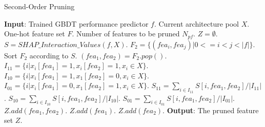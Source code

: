 \documentclass{article}
\begin{document}
\begin{algorithm}[ht]
\small
\caption{Second-Order Pruning}
\label{alg:2pruning}
\begin{algorithmic}[1]
\STATE \textbf{Input}: Trained GBDT performance predictor $f$. Current architecture pool $X$. One-hot feature set $F$. Number of features to be pruned $N_{pf}$.
\STATE $Z=\emptyset$.
\STATE $S = SHAP\_Interaction\_Values(f, X)$.
\STATE $F_2=\{(fea_i,fea_j)|0<=i<j<|f|\}$.
\STATE Sort $F_2$ according to $S$.
\STATE $(fea_1, fea_2)=F_2.pop()$.
\STATE $I_{11} = \{i|x_i[fea_1]=1,x_i[fea_2] = 1, x_i \in X\}$.
\STATE $I_{10} = \{i|x_i[fea_1]=1,x_1[fea_2] = 0, x_i \in X\}$.
\STATE $I_{01} = \{i|x_i[fea_1]=0,x_1[fea_2] = 1, x_i \in X\}$.
\STATE $S_{11} = \sum_{i\in I_{11}}S[i,fea_1,fea_2] / |I_{11}|$.
\STATE $S_{10} = \sum_{i\in I_{10}}S[i,fea_1,fea_2] / |I_{10}|$.
\STATE $S_{01} = \sum_{i\in I_{01}}S[i,fea_1,fea_2] / |I_{01}|$.
\STATE $Z.add(fea_1,fea_2)$.
\STATE $Z.add(fea_1)$.
\STATE $Z.add(fea_2)$.
\ENDIF
\ENDFOR
\STATE \textbf{Output}: The pruned feature set $Z$.
\end{algorithmic}
\end{algorithm}
\end{document}
